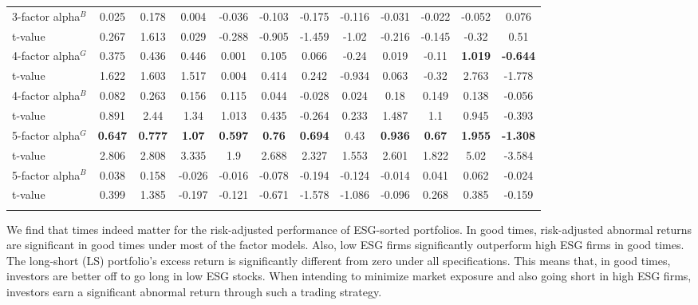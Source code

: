 \documentclass[11pt]{article}
\begin{document}
\begin{table}[!htbp]
{\begin{tabular}{@{\extracolsep{5pt}} lccccccccccc}
			3-factor alpha$^B$ & 0.025 & 0.178 & 0.004 & -0.036 & -0.103 & -0.175 & -0.116 & -0.031 & -0.022 & -0.052 & 0.076 \\ 
			t-value & 0.267 & 1.613 & 0.029 & -0.288 & -0.905 & -1.459 & -1.02 & -0.216 & -0.145 & -0.32 & 0.51 \\[4ex] 
			
			
			4-factor alpha$^G$ & 0.375 & 0.436 & 0.446 & 0.001 & 0.105 & 0.066 & -0.24 & 0.019 & -0.11 & \textbf{1.019} & \textbf{-0.644} \\ 
			t-value & 1.622 & 1.603 & 1.517 & 0.004 & 0.414 & 0.242 & -0.934 & 0.063 & -0.32 & 2.763 & -1.778 \\[2ex] 
			
			4-factor alpha$^B$ & 0.082 & 0.263 & 0.156 & 0.115 & 0.044 & -0.028 & 0.024 & 0.18 & 0.149 & 0.138 & -0.056 \\ 
			t-value & 0.891 & 2.44 & 1.34 & 1.013 & 0.435 & -0.264 & 0.233 & 1.487 & 1.1 & 0.945 & -0.393 \\[4ex] 
			
			
			5-factor alpha$^G$ & \textbf{0.647} & \textbf{0.777} & \textbf{1.07} & \textbf{0.597} & \textbf{0.76} & \textbf{0.694} & 0.43 & \textbf{0.936} & \textbf{0.67} & \textbf{1.955} & \textbf{-1.308} \\ 
			t-value & 2.806 & 2.808 & 3.335 & 1.9 & 2.688 & 2.327 & 1.553 & 2.601 & 1.822 & 5.02 & -3.584 \\[2ex] 
			
			5-factor alpha$^B$ & 0.038 & 0.158 & -0.026 & -0.016 & -0.078 & -0.194 & -0.124 & -0.014 & 0.041 & 0.062 & -0.024 \\ 
			t-value & 0.399 & 1.385 & -0.197 & -0.121 & -0.671 & -1.578 & -1.086 & -0.096 & 0.268 & 0.385 & -0.159 \\ 
			\hline \\[-1.8ex] 
	\end{tabular} }
\end{table} 


We find that times indeed matter for the risk-adjusted performance of ESG-sorted portfolios. In good times, risk-adjusted abnormal returns are significant in good times under most of the factor models. Also, low ESG firms significantly outperform high ESG firms in good times. The long-short (LS) portfolio's excess return is significantly different from zero under all specifications. This means that, in good times, investors are better off to go long in low ESG stocks. When intending to minimize market exposure and also going short in high ESG firms, investors earn a significant abnormal return through such a trading strategy.
\end{document}
